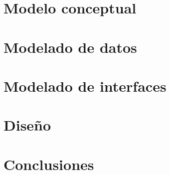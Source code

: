\documentclass{\ClassPath/viu-tfm-template}
\begin{document}
\chapter{Modelo conceptual}

\chapter{Modelado de datos}

\chapter{Modelado de interfaces}

\chapter{Diseño}


\chapter{Conclusiones}


\printbibliography[title={Referencias bibliográficas},heading=bibintoc]
\end{document}

